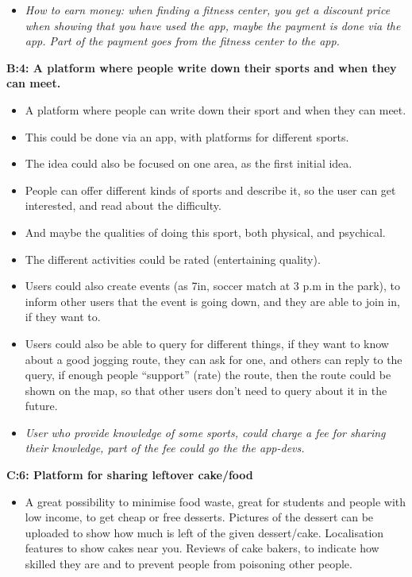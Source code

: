 \begin{multicols}{2}
{\begin{itemize}
	\item \textit{How to earn money:  when finding a fitness center, you get a discount price when showing that you have used the app, maybe the payment is done via the app. Part of the payment goes from the fitness center to the app.
}
\end{itemize}
\vspace{2em}
{\noindent \textbf{B:4: A platform where people write down their  sports and when they can meet.}}
\begin{itemize}
	\item A platform where people can write down their sport and when they can meet.
	\item This could be done via an app, with platforms for different sports.
	\item The idea could also be focused on one area, as the first initial idea.
	\item People can offer different kinds of sports and describe it, so the user can get interested, and read about the difficulty.
	\item And maybe the qualities of doing this sport, both physical, and psychical.
	\item The different activities could be rated (entertaining quality).
	\item Users could also create events (as 7in, soccer match at 3 p.m in the park), to inform other users that the event is going down, and they are able to join in, if they want to.
	\item Users could also be able to query for different things, if they want to know about a good jogging route, they can ask for one, and others can reply to the query, if enough people “support” (rate) the route, then the route could be shown on the map, so that other users don’t need to query about it in the future.
	\item \textit{User who provide knowledge of some sports, could charge a fee for sharing their knowledge, part of the fee could go the the app-devs.}
\end{itemize}
\vspace{2em}
{\noindent \textbf{C:6: Platform for sharing leftover cake/food}}
\begin{itemize}
	\item A great possibility to minimise food waste, great for students and people with low income, to get cheap or free desserts. Pictures of the dessert can be uploaded to show how much is left of the given dessert/cake. Localisation features to show cakes near you. Reviews of cake bakers, to indicate how skilled they are and to prevent people from poisoning other people.

\end{itemize}}
\end{multicols}

